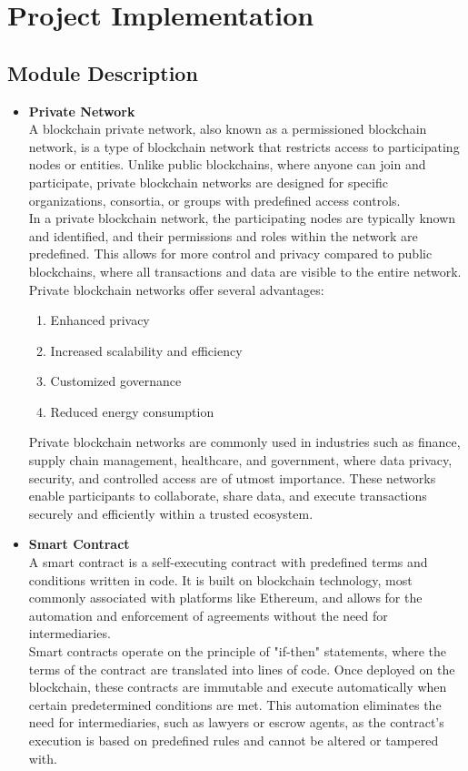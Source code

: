 \documentclass[oneside, 12pt]{book}
\begin{document}
\section{Project Implementation}
\newpage
\subsection{Module Description}
\begin{itemize}
	\item\textbf{Private Network}
	\\A blockchain private network, also known as a permissioned blockchain network, is a type of blockchain network that restricts access to participating nodes or entities. Unlike public blockchains, where anyone can join and participate, private blockchain networks are designed for specific organizations, consortia, or groups with predefined access controls.
	\\In a private blockchain network, the participating nodes are typically known and identified, and their permissions and roles within the network are predefined. This allows for more control and privacy compared to public blockchains, where all transactions and data are visible to the entire network.
	\\Private blockchain networks offer several advantages:
	\begin{enumerate}
		\item Enhanced privacy
		\item Increased scalability and efficiency
		\item Customized governance
		\item Reduced energy consumption
	\end{enumerate}
	Private blockchain networks are commonly used in industries such as finance, supply chain management, healthcare, and government, where data privacy, security, and controlled access are of utmost importance. These networks enable participants to collaborate, share data, and execute transactions securely and efficiently within a trusted ecosystem.
	\item\textbf{Smart Contract}
	\\A smart contract is a self-executing contract with predefined terms and conditions written in code. It is built on blockchain technology, most commonly associated with platforms like Ethereum, and allows for the automation and enforcement of agreements without the need for intermediaries.
	\\Smart contracts operate on the principle of "if-then" statements, where the terms of the contract are translated into lines of code. Once deployed on the blockchain, these contracts are immutable and execute automatically when certain predetermined conditions are met. This automation eliminates the need for intermediaries, such as lawyers or escrow agents, as the contract's execution is based on predefined rules and cannot be altered or tampered with.

\end{itemize}
\end{document}
